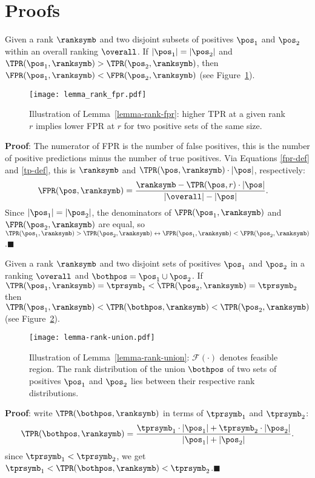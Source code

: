 \section{Proofs} \label{proofs}

\begin{lemma} \label{lemma-rank-fpr}
Given a rank $\ranksymb$ and two disjoint subsets of positives $\pos_1$ and $\pos_2$ within an overall ranking $\overall$. If $|\pos_1|=|\pos_2|$ and $\TPR(\pos_1, \ranksymb) > \TPR(\pos_2,\ranksymb)$, then $\FPR(\pos_1,\ranksymb) < \FPR(\pos_2,\ranksymb)$ (see Figure~\ref{fig:lemma-rank-fpr}).

\begin{figure}[!h]
  \centering
  \texttt{[image: lemma\_rank\_fpr.pdf]}
  \caption{Illustration of Lemma~\ref*{lemma-rank-fpr}: higher TPR at a given rank $r$ implies lower FPR at $r$ for two positive sets of the same size.}
  \label{fig:lemma-rank-fpr}
\end{figure}

\textbf{Proof}: The numerator of FPR is the number of false positives, this is the number of positive predictions minus the number of true positives. Via Equations \eqref{fpr-def} and \eqref{tp-def}, this is $\ranksymb$ and $\TPR(\pos,\ranksymb)\cdot|\pos|$, respectively:
\begin{align}
\FPR(\pos, \ranksymb) &= \frac{\ranksymb - \TPR(\pos, r) \cdot |\pos|}{|\overall|-|\pos|} \label{tpr-fpr}.
\end{align}
Since $|\pos_1|=|\pos_2|$, the denominators of $\FPR(\pos_1,\ranksymb)$ and $\FPR(\pos_2,\ranksymb)$ are equal, so $\TPR(\pos_1,\ranksymb)>\TPR(\pos_2,\ranksymb) \leftrightarrow \FPR(\pos_1,\ranksymb) < \FPR(\pos_2,\ranksymb)$.\hfill$\blacksquare$
\end{lemma}


\begin{lemma} \label{lemma-rank-union}
Given a rank $\ranksymb$ and two disjoint sets of positives $\pos_1$ and $\pos_2$ in a ranking $\overall$ and $\bothpos=\pos_1\cup\pos_2$. If $\TPR(\pos_1,\ranksymb) = \tprsymb_1 < \TPR(\pos_2, \ranksymb) = \tprsymb_2$ then $\TPR(\pos_1,\ranksymb) < \TPR(\bothpos,\ranksymb) < \TPR(\pos_2, \ranksymb)$ (see Figure~\ref{fig:lemma-rank-union}).

\begin{figure}[!h]
  \centering
  \texttt{[image: lemma-rank-union.pdf]}
  \caption{Illustration of Lemma~\ref*{lemma-rank-union}: $\mathcal{F}(\cdot)$ denotes feasible region. The rank distribution of the union $\bothpos$ of two sets of positives $\pos_1$ and $\pos_2$ lies between their respective rank distributions.} 
  \label{fig:lemma-rank-union}
\end{figure}

\textbf{Proof}: write $\TPR(\bothpos,\ranksymb)$ in terms of $\tprsymb_1$ and $\tprsymb_2$:
\begin{equation}
\TPR(\bothpos,\ranksymb) = \frac{\tprsymb_1 \cdot|\pos_1| + \tprsymb_2\cdot|\pos_2|}{|\pos_1|+|\pos_2|}. \label{tpr-union}
\end{equation}
since $\tprsymb_1 < \tprsymb_2$, we get $\tprsymb_1 < \TPR(\bothpos,\ranksymb) < \tprsymb_2$.\hfill$\blacksquare$
\end{lemma}



